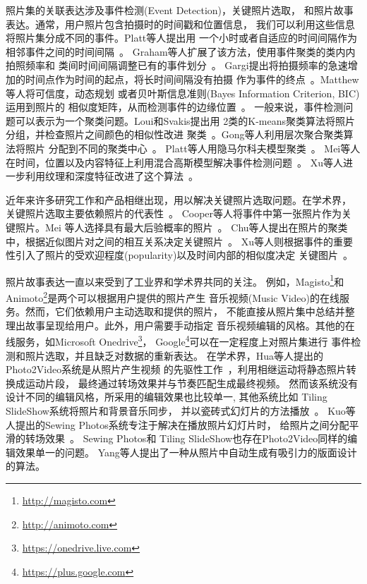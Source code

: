 照片集的关联表达涉及事件检测(Event Detection)，关键照片选取，
和照片故事表达。通常，用户照片包含拍摄时的时间戳和位置信息，
我们可以利用这些信息将照片集分成不同的事件。Platt等人提出用
一个小时或者自适应的时间间隔作为相邻事件之间的时间间隔~\cite{platt2003phototoc}。
Graham等人扩展了该方法，使用事件聚类的类内内拍照频率和
类间时间间隔调整已有的事件划分~\cite{graham2002time}。
Gargi提出将拍摄频率的急速增加的时间点作为时间的起点，将长时间间隔没有拍摄
作为事件的终点~\cite{gargi2003modeling}。Matthew等人将可信度，动态规划
或者贝叶斯信息准则(Bayes Information Criterion, BIC)运用到照片的
相似度矩阵，从而检测事件的边缘位置~\cite{cooper2005temporal}。
一般来说，事件检测问题可以表示为一个聚类问题。Loui和Svakis提出用
2类的K-means聚类算法将照片分组，并检查照片之间颜色的相似性改进
聚类~\cite{loui2000automatic}。Gong等人利用层次聚合聚类算法将照片
分配到不同的聚类中心~\cite{gong2007segmenting}。
Platt等人用隐马尔科夫模型聚类~\cite{platt2003phototoc}。
Mei等人在时间，位置以及内容特征上利用混合高斯模型解决事件检测问题~\cite{mei2006probabilistic}。
Xu等人进一步利用纹理和深度特征改进了这个算法~\cite{shen2016multi}。

近年来许多研究工作和产品相继出现，用以解决关键照片选取问题。在学术界，
关键照片选取主要依赖照片的代表性~\cite{cooper2005temporal,mei2006probabilistic,shen2016multi,chu2008automatic}。
Cooper等人将事件中第一张照片作为关键照片。Mei
等人选择具有最大后验概率的照片~\cite{mei2006probabilistic}。
Chu等人提出在照片的聚类中，根据近似图片对之间的相互关系决定关键照片~\cite{chu2008automatic}。
Xu等人则根据事件的重要性引入了照片的受欢迎程度(popularity)以及时间内部的相似度决定
关键图片~\cite{shen2016multi}。

照片故事表达一直以来受到了工业界和学术界共同的关注。
例如，Magisto\footnote{\url{http://magisto.com}}和
Animoto\footnote{\url{http://animoto.com}}是两个可以根据用户提供的照片产生
音乐视频(Music Video)的在线服务。然而，它们依赖用户主动选取和提供的照片，
不能直接从照片集中总结并整理出故事呈现给用户。此外，用户需要手动指定
音乐视频编辑的风格。其他的在线服务，如Microsoft
Onedrive\footnote{\url{https://onedrive.live.com}}，
Google\footnote{\url{https://plus.google.com}}可以在一定程度上对照片集进行
事件检测和照片选取，并且缺乏对数据的重新表达。
在学术界，Hua等人提出的Photo2Video系统是从照片产生视频
的先驱性工作~\cite{hua2006photo2video}，利用相继运动将静态照片转换成运动片段，
最终通过转场效果并与节奏匹配生成最终视频。
然而该系统没有设计不同的编辑风格，所采用的编辑效果也比较单一, 其他系统比如
Tiling SlideShow系统将照片和背景音乐同步，
并以瓷砖式幻灯片的方法播放~\cite{chu2007tiling}。
Kuo等人提出的Sewing Photos系统专注于解决在播放照片幻灯片时，
给照片之间分配平滑的转场效果~\cite{kuo2011sewing}。
Sewing Photos和
Tiling SlideShow也存在Photo2Video同样的编辑效果单一的问题。
Yang等人提出了一种从照片中自动生成有吸引力的版面设计的算法。


